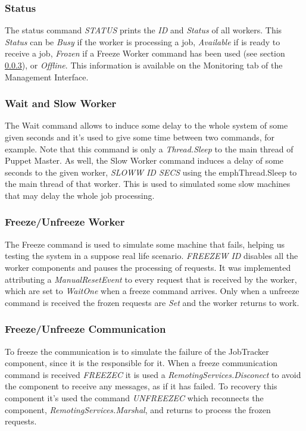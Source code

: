 \documentclass[times, 10pt,twocolumn]{article}
\begin{document}
            \subsubsection{Status}

            The status command \emph{STATUS} prints the \emph{ID} and \emph{Status} of all workers.
            This \emph{Status} can be  \emph{Busy} if the worker is processing a job, \emph{Available}
            if is ready to receive a job, \emph{Frozen} if a Freeze Worker command has been used (see section \ref{freeze}), or \emph{Offline}.
            This information is available on the Monitoring tab of the Management Interface.

            \subsubsection{Wait and Slow Worker}
            The Wait command allows to induce some delay to the whole system of some given seconds and it's used to give some time between two commands, for example.
            Note that this command is only a \emph{Thread.Sleep} to the main thread of Puppet Master.
           As well, the Slow Worker command induces a delay of some seconds to the given worker,
            \emph{SLOWW ID SECS} using the emph{Thread.Sleep} to the main thread of that worker. This is used to simulated some slow machines that may delay the whole job processing.

            \subsubsection{Freeze/Unfreeze Worker} \label{freeze}
            The Freeze command is used to simulate some machine that fails, helping us testing the system in a suppose real life scenario. \emph{FREEZEW ID}
            disables all the worker components and pauses the processing of requests. It was implemented attributing a \emph{ManualResetEvent}
            to every request that is received by the worker, which are set to \emph{WaitOne} when a freeze command arrives.
            Only when a unfreeze command is received the frozen requests are \emph{Set} and the worker returns to work.

          \subsubsection{Freeze/Unfreeze Communication}
          To freeze the communication is to simulate the failure of the JobTracker component, since it is the responsible for it.
          When a freeze communication command is received \emph{FREEZEC} it is used a \emph{RemotingServices.Disconect}
          to avoid the component to receive any messages, as if it has failed.
	        To recovery this component it's used the command \emph{UNFREEZEC} which reconnects the component, \emph{RemotingServices.Marshal},
          and returns to process the frozen requests.
\end{document}
